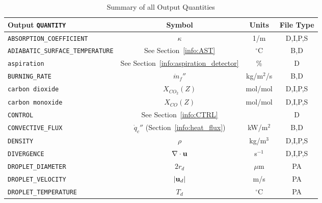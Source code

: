 \documentclass[11pt]{book}
\newcommand{\ct}{\tt\small}
\newcommand{\bu}{{\bf u}}
\newcommand{\dq}{\dot{q}}
\newcommand{\dm}{\dot{m}}
\begin{document}
\begin{table}[h!]
\begin{center}
\caption{Summary of all Output Quantities}
\label{tab:output}
\begin{tabular}{|l|c|c|c|}
\hline
Output {\ct QUANTITY}                           & Symbol                                        & Units          & File Type    \\ \hline \hline
{\ct ABSORPTION\_COEFFICIENT}                   & $\kappa$                                      & 1/m            & D,I,P,S      \\ \hline
{\ct ADIABATIC\_SURFACE\_TEMPERATURE}           & See Section~\ref{info:AST}                    & $^\circ$C      & B,D          \\ \hline
{\ct aspiration}                                & See Section~\ref{info:aspiration_detector}    & \%             & D            \\ \hline
{\ct BURNING\_RATE}                             & $\dm_f''$                                     & kg/m$^2$/s     & B,D          \\ \hline
{\ct carbon dioxide}                            & $X_{CO_2}(Z)$                                 & mol/mol        & D,I,P,S      \\ \hline
{\ct carbon monoxide}                           & $X_{CO}(Z)$                                   & mol/mol        & D,I,P,S      \\ \hline
{\ct CONTROL}                                   & See Section~\ref{info:CTRL}                   &                & D            \\ \hline
{\ct CONVECTIVE\_FLUX}                          & $\dq_c''$ (Section~\ref{info:heat_flux})      & kW/m$^2$       & B,D          \\ \hline
{\ct DENSITY}                                   & $\rho$                                        & kg/m$^3$       & D,I,P,S      \\ \hline
{\ct DIVERGENCE}                                & $\nabla \cdot \bu$                            & s$^{-1}$       & D,I,P,S      \\ \hline
{\ct DROPLET\_DIAMETER}                         & $2 r_d$                                       & $\mu$m         & PA           \\ \hline
{\ct DROPLET\_VELOCITY}                         & $|\bu_d|$                                     & m/s            & PA           \\ \hline
{\ct DROPLET\_TEMPERATURE}                      & $T_d$                                         & $^\circ$C      & PA           \\ \hline

\end{tabular}
\end{center}
\end{table}
\end{document}
